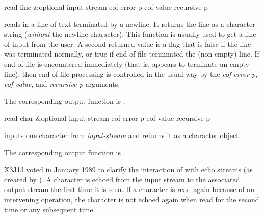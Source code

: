 \begin{defun}[Function]
read-line &optional input-stream eof-error-p eof-value recursive-p

 reads in a line of text terminated by a newline.
It returns the line as a character string (\emph{without} the newline character).
This function is usually used to get a line of input from the user.
A second returned value is a flag that is false if the line was
terminated normally, or true if end-of-file terminated the (non-empty) line.
If end-of-file is encountered immediately (that is, appears to terminate
an empty line), then end-of-file processing is controlled in the
usual way by the \emph{eof-error-p}, \emph{eof-value}, and \emph{recursive-p} arguments.

The corresponding output function is .
\end{defun}

\begin{defun}[Function]
read-char &optional input-stream eof-error-p eof-value recursive-p

 inputs one character from \emph{input-stream} and returns it
as a character object.

The corresponding output function is .

\begin{new}
X3J13 voted in January 1989
to clarify the interaction of  with echo streams
(as created by ).  A character is echoed from the input stream
to the associated output stream the first time it is seen.
If a character is read again because of an intervening  operation,
the character is not echoed again when read for the second time or any subsequent time.
\end{new}
\end{defun}

